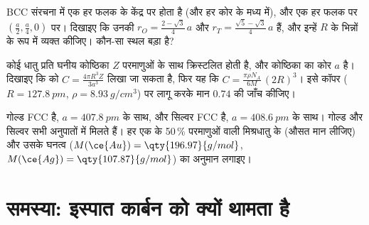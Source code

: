 \begin{exercise}[$\star\star\star$]\label{exo:b1:crystals-metals:10}
BCC संरचना में एक  हर फलक के केंद्र पर होता है
(और हर कोर के मध्य में), और एक  हर फलक पर
$(\frac{a}{2}, \frac{a}{4}, 0)$ पर। दिखाइए कि उनकी
 $r_O = \frac{2 - \sqrt3}{4}\,a$ और
$r_T = \frac{\sqrt5 - \sqrt3}{4}\,a$ हैं, और इन्हें $R$ के भिन्नों के रूप में
व्यक्त कीजिए। कौन-सा स्थल बड़ा है?
\end{exercise}

\begin{exercise}[$\star\star\star$]\label{exo:b1:crystals-metals:11}
कोई धातु प्रति घनीय कोष्ठिका $Z$ परमाणुओं के साथ क्रिस्टलित होती है, और कोष्ठिका का कोर $a$ है।
दिखाइए कि
 को $C = \frac{4\pi R^3 Z}{3a^3}$ लिखा जा सकता है, फिर यह कि
$C = \frac{\pi\rho N_A}{6M}\,(2R)^3$। इसे कॉपर ($R = \qty{127.8}{pm}$,
$\rho = \qty{8.93}{g/cm^3}$) पर लागू करके मान $0.74$ की जाँच कीजिए।
\end{exercise}

\begin{exercise}[$\star\star\star$]\label{exo:b1:crystals-metals:12}
गोल्ड FCC है, $a = \qty{407.8}{pm}$ के साथ, और सिल्वर FCC है,
$a = \qty{408.6}{pm}$ के साथ। गोल्ड और सिल्वर सभी अनुपातों में मिलते हैं। हर एक के
50\,\% परमाणुओं वाली मिश्रधातु के  (औसत मान लीजिए) और उसके घनत्व
($M(\ce{Au}) = \qty{196.97}{g/mol}$,
$M(\ce{Ag}) = \qty{107.87}{g/mol}$) का अनुमान लगाइए।
\end{exercise}

\section{समस्या: इस्पात कार्बन को क्यों थामता है}

